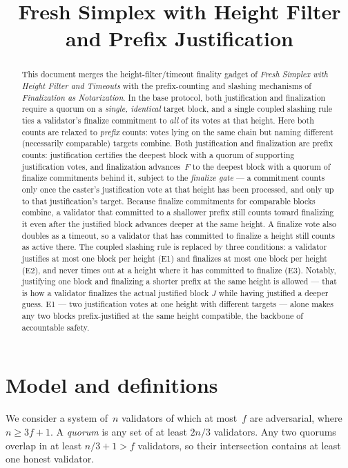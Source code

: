 \ifx\litemode\undefined\documentclass{article}\fi
\title{Fresh Simplex with Height Filter and Prefix Justification}
\theoremstyle{plain}
\theoremstyle{definition}
\theoremstyle{remark}
\begin{document}
\maketitle

\begin{abstract}
This document merges the height-filter/timeout finality gadget of \emph{Fresh Simplex with Height Filter and Timeouts} with the prefix-counting and slashing mechanisms of \emph{Finalization as Notarization}.
In the base protocol, both justification and finalization require a quorum on a \emph{single, identical} target block, and a single coupled slashing rule ties a validator's finalize commitment to \emph{all} of its votes at that height.
Here both counts are relaxed to \emph{prefix} counts: votes lying on the same chain but naming different (necessarily comparable) targets combine.
Both justification and finalization are prefix counts: justification certifies the deepest block with a quorum of supporting justification votes, and finalization advances~$F$ to the deepest block with a quorum of finalize commitments behind it, subject to the \emph{finalize gate} --- a commitment counts only once the caster's justification vote at that height has been processed, and only up to that justification's target. Because finalize commitments for comparable blocks combine, a validator that committed to a shallower prefix still counts toward finalizing it even after the justified block advances deeper at the same height.
A finalize vote also doubles as a timeout, so a validator that has committed to finalize a height still counts as active there.
The coupled slashing rule is replaced by three conditions: a validator justifies at most one block per height (E1) and finalizes at most one block per height (E2), and never times out at a height where it has committed to finalize (E3).
Notably, justifying one block and finalizing a shorter prefix at the same height is allowed --- that is how a validator finalizes the actual justified block $J$ while having justified a deeper guess.
E1 --- two justification votes at one height with different targets --- alone makes any two blocks prefix-justified at the same height compatible, the backbone of accountable safety.
\end{abstract}

\section{Model and definitions}\label{sec:model}

We consider a system of~$n$ validators of which at most~$f$ are adversarial, where $n \geq 3f + 1$.
A \emph{quorum} is any set of at least $2n/3$ validators.
Any two quorums overlap in at least $n/3 + 1 > f$ validators, so their intersection contains at least one honest validator.
\end{document}
